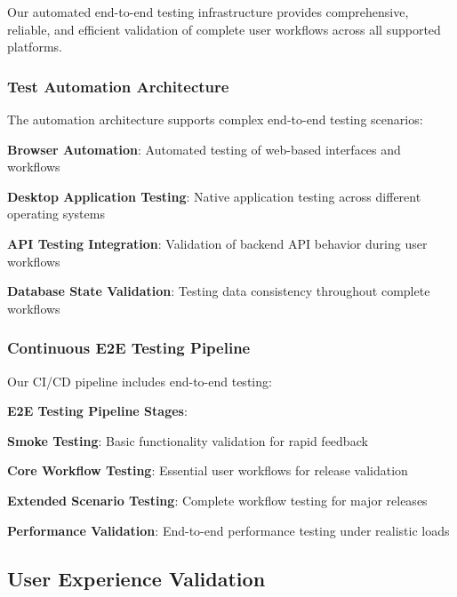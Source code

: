 Our automated end-to-end testing infrastructure provides comprehensive, reliable, and efficient validation of complete user workflows across all supported platforms.

\subsubsection*{Test Automation Architecture}

The automation architecture supports complex end-to-end testing scenarios:

\begin{compactlist}
    \item \textbf{Browser Automation}: Automated testing of web-based interfaces and workflows
    \item \textbf{Desktop Application Testing}: Native application testing across different operating systems
    \item \textbf{API Testing Integration}: Validation of backend API behavior during user workflows
    \item \textbf{Database State Validation}: Testing data consistency throughout complete workflows
\end{compactlist}

\subsubsection*{Continuous E2E Testing Pipeline}

Our CI/CD pipeline includes end-to-end testing:

\begin{alertbox}
\textbf{E2E Testing Pipeline Stages}:
\begin{compactlist}
    \item \textbf{Smoke Testing}: Basic functionality validation for rapid feedback
    \item \textbf{Core Workflow Testing}: Essential user workflows for release validation
    \item \textbf{Extended Scenario Testing}: Complete workflow testing for major releases
    \item \textbf{Performance Validation}: End-to-end performance testing under realistic loads
\end{compactlist}
\end{alertbox}

\subsection*{User Experience Validation}

